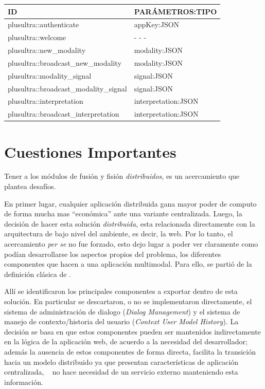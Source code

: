 \begin{center}
    \begin{tabular}{| l | l |}
    \hline
    ID & PARÁMETROS:TIPO \\ \hline
    plusultra::authenticate & appKey:JSON \\ \hline
    plusultra::welcome & - - - \\ \hline
    plusultra::new\_modality & modality:JSON \\ \hline
    plusultra::broadcast\_new\_modality & modality:JSON \\ \hline
    plusultra::modality\_signal & signal:JSON \\ \hline
    plusultra::broadcast\_modality\_signal & signal:JSON \\ \hline
    plusultra::interpretation & interpretation:JSON \\ \hline
    plusultra::broadcast\_interpretation & interpretation:JSON \\
    \hline
    \end{tabular}
\end{center}


\section{Cuestiones Importantes}
Tener a los módulos de fusión y fisión \emph{distribuidos}, es un acercamiento que plantea desafíos.

En primer lugar, cualquier aplicación distribuida gana mayor poder de computo de forma mucha mas ``económica'' ante una variante centralizada. Luego, la decisión de hacer esta solución \emph{distribuida}, esta relacionada directamente con la arquitectura de bajo nivel del ambiente, es decir, la web. Por lo tanto, el acercamiento \emph{per se} no fue forzado, esto dejo lugar a poder ver claramente como podían desarrollarse los aspectos propios del problema, \ie los diferentes componentes que hacen a una aplicación multimodal. Para ello, se partió de la definición clásica de  \citet{dumas2009multimodal}. 

Allí se identificaron los principales componentes a exportar dentro de esta solución. En particular se descartaron, o no se implementaron directamente, el sistema de administración de dialogo (\emph{Dialog Management}) y el sistema de manejo de contexto/historia del usuario (\emph{Context User Model History}). La decisión se basa en que estos componentes pueden ser mantenidos indirectamente en la lógica de la aplicación web, de acuerdo a la necesidad del desarrollador; además la ausencia de estos componentes de forma directa, facilita la transición hacia un modelo distribuido ya que presentan características de aplicación centralizada, \ie~ no hace necesidad de un servicio externo manteniendo esta información.

